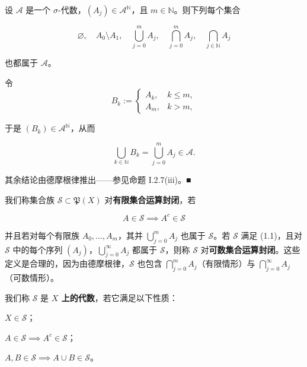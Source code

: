 \begin{remark}

设 $ \mathcal{A} $ 是一个 $ \sigma $-代数，$ (A_{j}) \in \mathcal{A}^{\mathbb{N}} $，且 $ m \in \mathbb{N} $。则下列每个集合

\[
\varnothing , \quad A_{0} \setminus A_{1} , \quad \bigcup_{j=0}^{m} A_{j} , \quad \bigcap_{j=0}^{m} A_{j} , \quad \bigcap_{j \in \mathbb{N}} A_{j}
\]

也都属于 $ \mathcal{A} $。

\proofhead
令
\begin{equation*}
B_{k} := \begin{cases} A_{k} , & k \le m , \\ A_{m} , & k > m , \end{cases}
\end{equation*}

于是 $ (B_{k}) \in \mathcal{A}^{\mathbb{N}} $，从而

\[
\bigcup_{k \in \mathbb{N}} B_{k} = \bigcup_{j=0}^{m} A_{j} \in \mathcal{A} .
\]

其余结论由德摩根律推出——参见命题 I.2.7(iii)。\nobreak\hspace{0.35em}■

我们称集合族 $ \mathcal{S} \subset \mathfrak{P}(X) $ 对\textbf{有限集合运算封闭}，若

\begin{equation}
A \in \mathcal{S} \implies A^{c} \in \mathcal{S}\tag{1.1}
\end{equation}

并且若对每个有限族 $ A_{0}, \ldots, A_{m} $，其并 $ \bigcup_{j=0}^{m} A_{j} $ 也属于 $ \mathcal{S} $。若 $ \mathcal{S} $ 满足 (1.1)，且对 $ \mathcal{S} $ 中的每个序列 $ (A_{j}) $，$ \bigcup_{j=0}^{\infty} A_{j} $ 都属于 $ \mathcal{S} $，则称 $ \mathcal{S} $ 对\textbf{可数集合运算封闭}。这些定义是合理的，因为由德摩根律，$ \mathcal{S} $ 也包含 $ \bigcap_{j=0}^{m} A_{j} $（有限情形）与 $ \bigcap_{j=0}^{\infty} A_{j} $（可数情形）。

我们称 $ \mathcal{S} $ 是 \textbf{$ X $ 上的代数}，若它满足以下性质：

\begin{subitems}
\item

$ X \in \mathcal{S} $；

\item

$ A \in \mathcal{S} \implies A^{c} \in \mathcal{S} $；

\item

$ A, B \in \mathcal{S} \implies A \cup B \in \mathcal{S} $。

\end{subitems}

\end{remark}

